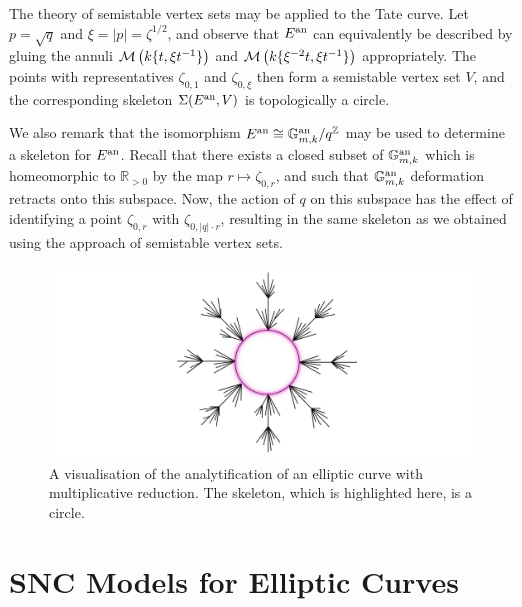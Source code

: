 The theory of semistable vertex sets may be applied to the Tate curve.
Let $p = \sqrt{q}$ and $\xi = |p| = \zeta^{1/2}$, and observe that $E^{\text{an}}$ can equivalently be described by gluing the annuli $\mathcal{M}\left(k\{t, \xi t^{-1}\}\right)$ and $\mathcal{M}\left(k\{\xi^{-2} t, \xi t^{-1}\}\right)$ appropriately.
The points with representatives $\zeta_{0, 1}$ and $\zeta_{0, \xi}$ then form a semistable vertex set $V$, and the corresponding skeleton $\Sigma(E^{\text{an}}, V)$ is topologically a circle.

We also remark that the isomorphism $E^{\text{an}} \cong \mathbb{G}^{\text{an}}_{m, k}/q^{\mathbb{Z}}$ may be used to determine a skeleton for $E^{\text{an}}$.
Recall that there exists a closed subset of $\mathbb{G}^{\text{an}}_{m, k}$ which is homeomorphic to $\mathbb{R}_{> 0}$ by the map $r \mapsto \zeta_{0, r}$, and such that $\mathbb{G}^{\text{an}}_{m, k}$ deformation retracts onto this subspace. 
Now, the action of $q$ on this subspace has the effect of identifying a point $\zeta_{0, r}$ with $\zeta_{0, |q|\cdot r}$, resulting in the same skeleton as we obtained using the approach of semistable vertex sets.

\begin{figure}[!ht]
    \centering
    \includegraphics[width=1.0\textwidth]{Images/ellipticcurve.png}
    \caption{A visualisation of the analytification of an elliptic curve with multiplicative reduction.
    The skeleton, which is highlighted here, is a circle.}
    \label{fig:ellipticcurve}
\end{figure}

\section{SNC Models for Elliptic Curves}

